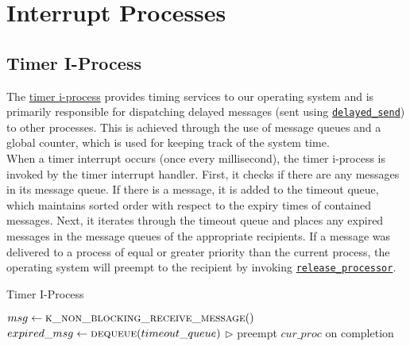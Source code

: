 \documentclass[12pt]{report}
\begin{document}
\section{Interrupt Processes}

\subsection{Timer I-Process}
\label{subsec:Timer I-Process}

The \hyperref[alg:timeriprocess]{timer i-process} provides timing services to our operating system and is primarily responsible for dispatching delayed messages (sent using \hyperref[alg:sendingdelayedmessages]{\texttt{delayed_send}}) to other processes. This is achieved through the use of message queues and a global counter, which is used for keeping track of the system time.\\

When a timer interrupt occurs (once every millisecond), the timer i-process is invoked by the timer interrupt handler. First, it checks if there are any messages in its message queue. If there is a message, it is added to the timeout queue, which maintains sorted order with respect to the expiry times of contained messages. Next, it iterates through the timeout queue and places any expired messages in the message queues of the appropriate recipients. If a message was delivered to a process of equal or greater priority than the current process, the operating system will preempt to the recipient by invoking \hyperref[alg:releasingtheprocessor]{\texttt{release_processor}}.\\

\begin{algorithm}
\caption{Timer I-Process}
\label{alg:timeriprocess}
\begin{algorithmic}[1]
    \State $msg \leftarrow \Call{k\_non\_blocking\_receive\_message}{\null}$
    \State {}
        \State $expired\_msg \leftarrow \Call{dequeue}{timeout\_queue}$
        \State {} 
            \State $\triangleright$ preempt $cur\_proc$ on completion
        \EndIf
    \EndWhile
\EndProcedure
\end{algorithmic}
\end{algorithm}
\end{document}
